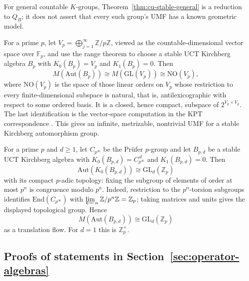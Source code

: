 For general countable $K$-groups, Theorem~\ref{thm:cu-stable-general} is a
reduction to $Q_B$; it does not assert that every such group's UMF has a
known geometric model.

\begin{example}\label{ex:cu-vector-space}
 For a prime $p$, let $V_p=\bigoplus_{j=1}^{\infty}\mathbb{Z}/p\mathbb{Z}$, viewed as the countable-dimensional vector space
over $\mathbb{F}_p$, and use the range theorem to choose a stable UCT
Kirchberg algebra $B_p$ with $K_0(B_p)=V_p$ and $K_1(B_p)=0$. Then 
\begin{equation*}
M(\mathrm{Aut}(B_p))\cong M(\mathrm{GL}(V_p)) \cong\mathrm{NO}(V_p),
\end{equation*}
where $\mathrm{NO}(V_p)$ is the space of those linear orders on $V_p$ whose
restriction to every finite-dimensional subspace is natural, that is,
antilexicographic with respect to some ordered basis. It is a closed, hence
compact, subspace of $2^{V_p\times V_p}$. The last identification is the
vector-space computation in the KPT correspondence \cite[Theorem 8.2(ii)]{KPT2005}. This gives an infinite, metrizable, nontrivial UMF for a stable
Kirchberg automorphism group.
\end{example}

\begin{example}\label{ex:cu-prufer}
 For a prime $p$ and $d\geq1$, let $C_{p^\infty}$ be the
Pr\"ufer $p$-group and let $B_{p,d}$ be a stable UCT Kirchberg algebra with $K_0(B_{p,d})=C_{p^\infty}^{\,d}$ and $K_1(B_{p,d})=0$. Then 
\begin{equation*}
\mathrm{Aut}(K_0(B_{p,d}))\cong\mathrm{GL}_d(\mathbb{Z}_p)
\end{equation*}
with its compact $p$-adic topology: fixing the subgroup of elements of order
at most $p^n$ is congruence modulo $p^n$. Indeed, restriction to the $p^n$-torsion subgroups identifies $\mathrm{End}(C_{p^\infty})$ with $\varprojlim_n\mathbb{Z}/p^n\mathbb{Z}=\mathbb{Z}_p$; taking matrices and
units gives the displayed topological group. Hence 
\begin{equation*}
M(\mathrm{Aut}(B_{p,d}))\cong\mathrm{GL}_d(\mathbb{Z}_p)
\end{equation*}
as a translation flow. For $d=1$ this is $\mathbb{Z}_p^\times$.
\end{example}

\subsection{Proofs of statements in Section~\ref{sec:operator-algebras}}\label{sec:cu-encyclopaedia-proofs}

